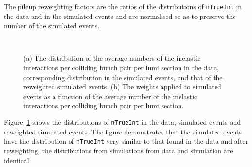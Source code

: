The pileup reweighting factors are the ratios of the distributions of
\verb!nTrueInt! in the data and in the simulated events and are
normalised so as to preserve the number of the simulated events.

\begin{figure}[h!]
  \centering
   ~
  \caption{(a) The distribution of the average numbers of the
    inelastic interactions per colliding bunch pair per lumi section
    in the data, corresponding distribution in the simulated events,
    and that of the reweighted simulated events. (b) The weights
    applied to simulated events as a function of the average number of
    the inelastic interactions per colliding bunch pair per lumi
    section.}
  \label{f044_corr_nTrueInt_data_mc_norm}
\end{figure}

Figure~\ref{f044_corr_nTrueInt_data_mc_norm} shows the distributions
of \verb!nTrueInt! in the data, simulated events and reweighted
simulated events. The figure demonstrates that the simulated events
have the distribution of \verb!nTrueInt! very similar to that found in
the data and after reweighting, the distributions from simulations
from data and simulation are identical.

